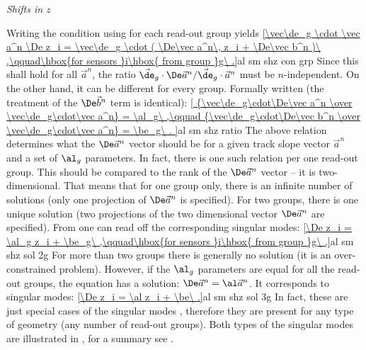 \baselineskip
\indent\em{Shifts in $z$}

Writing the condition  using  for each read-out group yields
\eqref{\vec\de_g \cdot \vec a^n \De z_i = \vec\de_g \cdot (
	\De\vec a^n\, z_i + \De\vec b^n
)\ ,\qquad\hbox{for sensors }i\hbox{ from group }g\ .}{al sm shz con grp}
Since this shall hold for all $\vec a^n$, the ratio $\vec\de_g\cdot\De\vec a^n / \vec\de_g\cdot\vec a^n$ must be $n$-independent. On the other hand, it can be different for every group. Formally written (the treatment of the $\De\vec b^n$ term is identical):
\eqref{
{\vec\de_g\cdot\De\vec a^n \over \vec\de_g\cdot\vec a^n} = \al_g\ ,\qquad
{\vec\de_g\cdot\De\vec b^n \over \vec\de_g\cdot\vec a^n} = \be_g\ .
}{al sm shz ratio}
The above relation determines what the $\De\vec a^n$ vector should be for a given track slope vector $\vec a^n$ and a set of $\al_g$ parameters. In fact, there is one such relation per one read-out group. This should be compared to the rank of the $\De\vec a^n$ vector -- it is two-dimensional. That means that for one group only, there is an infinite number of solutions (only one projection of $\De\vec a^n$ is specified). For two groups, there is one unique solution (two projections of the two dimensional vector $\De\vec a^n$ are specified). From  one can read off the corresponding singular modes:
\eqref{\De z_i = \al_g z_i + \be_g\ ,\qquad\hbox{for sensors }i\hbox{ from group }g\ ,}{al sm shz sol 2g}
For more than two groups there is generally no solution (it is an over-constrained problem). However, if the $\al_g$ parameters are equal for all the read-out groups, the equation has a solution: $\De\vec a^n = \al \vec a^n$. It corresponds to singular modes:
\eqref{\De z_i = \al z_i + \be\ .}{al sm shz sol 3g}
In fact, these are just special cases of the singular modes , therefore they are present for any type of geometry (any number of read-out groups). Both types of the singular modes are illustrated in , for a summary see .



